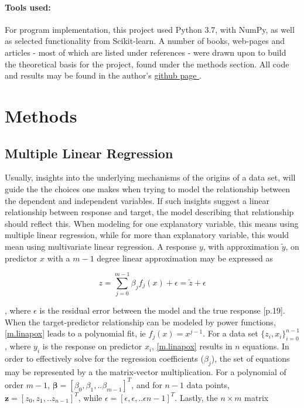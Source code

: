 \documentclass[%
oneside,                 %
final,                   %
10pt]{article}
\begin{document}
\paragraph{Tools used:} 
For program implementation, this project used Python 3.7, with NumPy, as well as selected functionality from Scikit-learn. A number of books, web-pages and articles - most of which are listed under references - were drawn upon to build the theoretical basis for the project, found under the methods section.
All code and results may be found in the author's \href{https://github.com/johanere/FYS-STK4155/tree/master/Project1}{github page }.



\section{Methods}
\subsection{Multiple Linear Regression}
Usually, insights into the underlying mechanisms of the origins of a data set, will guide the the choices one makes when trying to model the relationship between the dependent and independent variables. If such insights suggest a linear relationship between response and target, the model describing that relationship should reflect this. When modeling for one explanatory variable, this means using multiple linear regression, while for more than explanatory variable, this would mean using multivariate linear regression. A response $y$, with approximation $\tilde{y}$, on predictor $x$ with a $m-1$ degree linear approximation may be expressed as

\begin{equation}
\displaystyle z=\sum_{j=0}^{m-1} \beta_j f_j(x)+\epsilon = \tilde{z}+\epsilon  
\label{m.linapox}
\end{equation}

, where $\epsilon$ is the residual error between the model and the true response \cite{MurphyKevin}[p.19]. When the target-predictor relationship can be modeled by power functions, \eqref{m.linapox} leads to a polynomial fit, ie $f_j(x)=x^{j-1}$. For a data set $\{z_i,x_i\} _{i=0}^{n-1}$, where $y_i$ is the response on predictor $x_i$, \eqref{m.linapox} results in $n$ equations. In order to effectively solve for the regression coefficients ($\beta_j$), the set of equations may be represented by a the matrix-vector multiplication. For a polynomial of order $m-1$, $\bm{\beta}=[\beta_0,\beta_1,..\beta_{m-1}]^T$, and for $n-1$ data points,  $\bm{z}=[z_0,z_1,..z_{n-1}]^T$, while $ \epsilon= [\epsilon,\epsilon,..\epsilon{n-1}]^T$. Lastly, the $n \times m $ matrix
\end{document}
